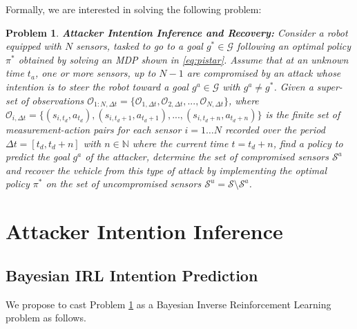 \documentclass[letterpaper, 10 pt, conference]{ieeeconf}  %
\newcommand{\Ne}{\mathbb {N}}
\newtheorem{problem}{Problem}
\newcommand\NB[1]{$\spadesuit$\footnote{NB: #1}}
\begin{document}
Formally, we are interested in solving the following problem:
\begin{problem}\label{prob:p1}
{ \bf Attacker Intention Inference and Recovery:} Consider a robot equipped with $N$ sensors, tasked to go to a goal $g^* \in \mathcal G$ following an optimal policy $\pi^*$ obtained by solving an MDP shown in \eqref{eq:pistar}. Assume that at an unknown time $t_a$, one or more sensors, up to $N-1$ are compromised by an attack whose intention is to steer the robot toward a goal $g^a \in \mathcal G$ with $g^a \neq g^*$. Given a super-set of observations $\mathcal{O}_{1:N,\Delta t} = \{\mathcal{O}_{1,\Delta t}, \mathcal{O}_{2,\Delta t}, ..., \mathcal{O}_{N,\Delta t}\}$, where $\mathcal{O}_{i,\Delta t} = \{(s_{i,t_d}, a_{t_d}), (s_{i,t_d+1}, a_{t_d+1}), ..., (s_{i,t_d+n}, a_{t_d+n})\}$ is the finite set of measurement-action pairs for each sensor $i=1 \ldots N$ recorded over the period $\Delta t = [t_d, t_d+n ]$ with $n \in \Ne$ where the current time $t=t_d+n$, find a policy to predict the goal $g^a$ of the attacker, determine the set of compromised sensors $\mathcal{S}^a$ and recover the vehicle from this type of attack by implementing the optimal policy $\pi^*$ on the set of uncompromised sensors $\mathcal S^u = \mathcal S \setminus \mathcal{S}^a$.


\end{problem}

\section{Attacker Intention Inference}\label{sec:approach}
\subsection{Bayesian IRL Intention Prediction}\label{sec:approach1}
We propose to cast Problem \ref{prob:p1} as a Bayesian Inverse Reinforcement Learning problem as follows. 
\end{document}
